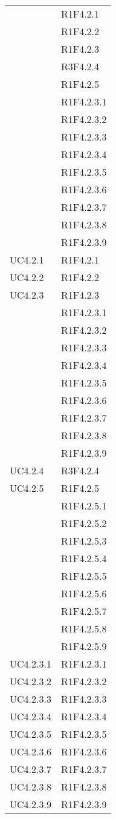 \begin{longtable}{|>{\centering}m{5cm}|m{5cm}<{\centering}|}
{UC4.2}&{R1F4.2.1}\\
&{R1F4.2.2}\\
&{R1F4.2.3}\\
&{R3F4.2.4}\\
&{R1F4.2.5}\\
&{R1F4.2.3.1}\\
&{R1F4.2.3.2}\\
&{R1F4.2.3.3}\\
&{R1F4.2.3.4}\\
&{R1F4.2.3.5}\\
&{R1F4.2.3.6}\\
&{R1F4.2.3.7}\\
&{R1F4.2.3.8}\\
&{R1F4.2.3.9}\\ \hline
{UC4.2.1}&{R1F4.2.1}\\ \hline
{UC4.2.2}&{R1F4.2.2}\\ \hline
{UC4.2.3}&{R1F4.2.3}\\
&{R1F4.2.3.1}\\
&{R1F4.2.3.2}\\
&{R1F4.2.3.3}\\
&{R1F4.2.3.4}\\
&{R1F4.2.3.5}\\
&{R1F4.2.3.6}\\
&{R1F4.2.3.7}\\
&{R1F4.2.3.8}\\
&{R1F4.2.3.9}\\ \hline
{UC4.2.4}&{R3F4.2.4}\\ \hline
{UC4.2.5}&{R1F4.2.5}\\
&{R1F4.2.5.1}\\
&{R1F4.2.5.2}\\
&{R1F4.2.5.3}\\
&{R1F4.2.5.4}\\
&{R1F4.2.5.5}\\
&{R1F4.2.5.6}\\
&{R1F4.2.5.7}\\
&{R1F4.2.5.8}\\
&{R1F4.2.5.9}\\ \hline
{UC4.2.3.1}&{R1F4.2.3.1}\\ \hline
{UC4.2.3.2}&{R1F4.2.3.2}\\ \hline
{UC4.2.3.3}&{R1F4.2.3.3}\\ \hline
{UC4.2.3.4}&{R1F4.2.3.4}\\ \hline
{UC4.2.3.5}&{R1F4.2.3.5}\\ \hline
{UC4.2.3.6}&{R1F4.2.3.6}\\ \hline
{UC4.2.3.7}&{R1F4.2.3.7}\\ \hline
{UC4.2.3.8}&{R1F4.2.3.8}\\ \hline
{UC4.2.3.9}&{R1F4.2.3.9}\\ \hline


\end{longtable}
